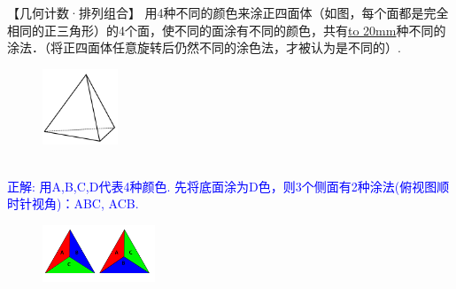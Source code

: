 \item {
    【几何计数·排列组合】
    用4种不同的颜色来涂正四面体（如图，每个面都是完全相同的正三角形）的4个面，使不同的面涂有不同的颜色，共有\underline{\hbox to 20mm{}}种不同的涂法．（将正四面体任意旋转后仍然不同的涂色法，才被认为是不同的）.
    \begin{figure}[H] 
        \centering
        \includegraphics[width=0.2\textwidth]{./pics/Chapter_4/2010_1.png}
    \end{figure}
    \ifshowSolution 
        \fangsong{}\textcolor{blue}{
            \\正解: 用A,B,C,D代表4种颜色. 先将底面涂为D色，则3个侧面有2种涂法(俯视图顺时针视角)：ABC, ACB.\\
            \begin{figure}[H] 
                \centering
                \includegraphics[width=0.3\textwidth]{./pics/Chapter_4/seikai_2010_1.png}
            \end{figure}
        }
    \else
        \vspace{1cm}
    \fi
}

